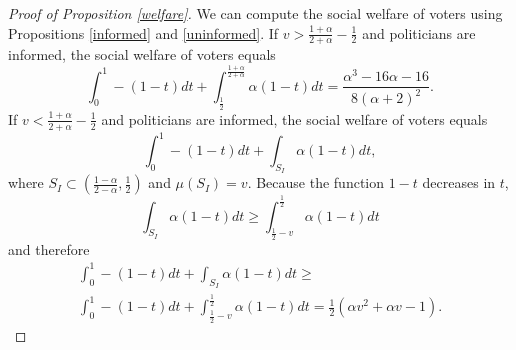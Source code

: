 \documentclass[12pt,english]{article}
\begin{document}
\begin{proof}[Proof of Proposition \ref{welfare}]
We can compute the social welfare of voters using Propositions \ref{informed} and \ref{uninformed}. If $v > \frac{1 + \alpha }{2 + \alpha }-\frac{1}{2}$ and politicians are informed, the social welfare of voters equals
\begin{equation*}
\label{eq:SW_informed_low_v}
\int_0^1 -(1-t)dt + \int_{\frac{1}{2}}^{\frac{1 + \alpha }{2 + \alpha }} \alpha (1-t)dt = \frac{\alpha ^3-16 \alpha -16}{8 (\alpha +2)^2}.
\end{equation*}
If $v < \frac{1 + \alpha }{2 + \alpha }-\frac{1}{2}$ and politicians are informed, the social welfare of voters equals
\begin{equation*}
\int_0^1 -(1-t)dt + \int_{S_I} \alpha (1-t)dt,
\end{equation*}
where $S_I \subset (\frac{1 - \alpha}{2 - \alpha},\frac{1}{2})$ and $\mu(S_I) = v$. Because the function $1-t$ decreases in $t$, 
\begin{equation*}
\int_{S_I} \alpha (1-t)dt \geq \int_{\frac{1}{2} - v}^{\frac{1}{2}} \alpha (1-t)dt 
\end{equation*}
and therefore 
\begin{equation}
\label{eq:SW_informed_high_v}
\begin{aligned}
\int_0^1 -(1-t)dt + \int_{S_I} \alpha (1-t)dt \geq \\
\int_0^1 -(1-t)dt + \int_{\frac{1}{2} - v}^{\frac{1}{2}} \alpha (1-t)dt = \frac{1}{2} \left(\alpha  v^2+\alpha  v-1\right).
\end{aligned}
\end{equation}


\end{proof}
\end{document}
